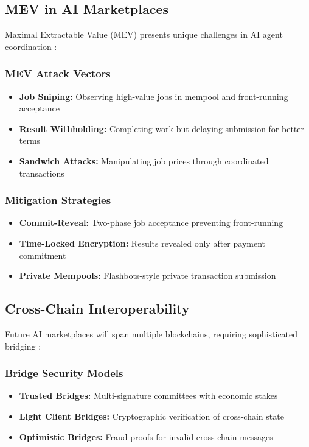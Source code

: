 \subsection{MEV in AI Marketplaces}

Maximal Extractable Value (MEV) presents unique challenges in AI agent coordination \citep{daian2020flashboys}:

\subsubsection{MEV Attack Vectors}
\begin{itemize}
    \item \textbf{Job Sniping:} Observing high-value jobs in mempool and front-running acceptance
    \item \textbf{Result Withholding:} Completing work but delaying submission for better terms
    \item \textbf{Sandwich Attacks:} Manipulating job prices through coordinated transactions
\end{itemize}

\subsubsection{Mitigation Strategies}
\begin{itemize}
    \item \textbf{Commit-Reveal:} Two-phase job acceptance preventing front-running
    \item \textbf{Time-Locked Encryption:} Results revealed only after payment commitment
    \item \textbf{Private Mempools:} Flashbots-style private transaction submission
\end{itemize}

\subsection{Cross-Chain Interoperability}

Future AI marketplaces will span multiple blockchains, requiring sophisticated bridging \citep{zamyatin2021sok}:

\subsubsection{Bridge Security Models}
\begin{itemize}
    \item \textbf{Trusted Bridges:} Multi-signature committees with economic stakes
    \item \textbf{Light Client Bridges:} Cryptographic verification of cross-chain state
    \item \textbf{Optimistic Bridges:} Fraud proofs for invalid cross-chain messages
\end{itemize}

